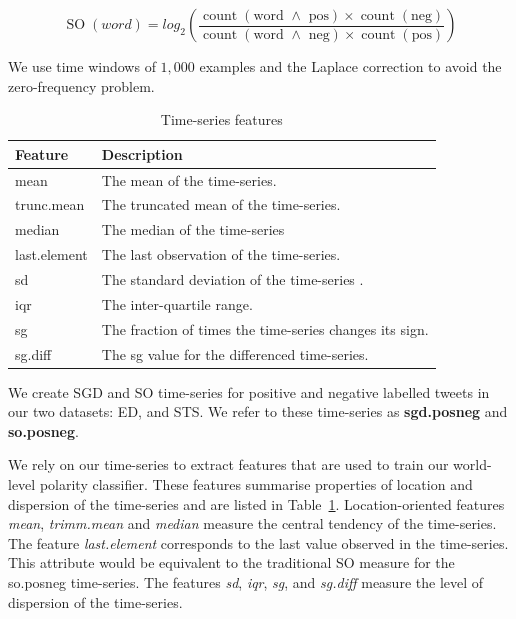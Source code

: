 \documentclass{sig-alternate}
\begin{document}
\begin{equation}\label{eq:so}
 \operatorname{SO}(word) = log_2 \left( \frac{\operatorname{count}(\text{word $\wedge$ pos}) \times \operatorname{count}(\text{neg})}{\operatorname{count}(\text{word $\wedge$ neg}) \times \operatorname{count}(\text{pos})}\right)
\end{equation}


We use time windows of $1,000$ examples and the Laplace correction to avoid the zero-frequency problem. 


\begin{table}[htbp]
\footnotesize
\begin{center}
\begin{tabular}{l|l}
\hline
Feature & Description \\ \hline
mean &  The mean of the time-series. \\ 
trunc.mean &  The truncated mean of the time-series. \\ 
median &  The median of the time-series \\ 
last.element &  The last observation of the time-series.\\ 
sd &  The standard deviation of the time-series . \\ 
iqr &  The inter-quartile range. \\ 
sg &  The fraction of times the time-series changes its sign. \\ 
sg.diff &  The sg value for the  differenced time-series. \\ \hline
\end{tabular}
\end{center}
\caption{Time-series features}
\label{tab:feat}
\end{table}

We create SGD and SO time-series for positive and negative labelled tweets in our two datasets: ED, and STS. We refer to these time-series as \textbf{sgd.posneg} and \textbf{so.posneg}. 


We rely on our time-series to extract features that are used to train our world-level polarity classifier. These features summarise properties of location and dispersion of the time-series and are listed in Table~\ref{tab:feat}. Location-oriented features \emph{mean}, \emph{trimm.mean} and \emph{median} measure the central tendency of the time-series. The feature \emph{last.element} corresponds to the last value observed in the time-series.  This attribute  would be equivalent to the traditional SO measure for the so.posneg time-series. The features \emph{sd}, \emph{iqr}, \emph{sg}, and \emph{sg.diff} measure the level of dispersion of the time-series. 
\end{document}
